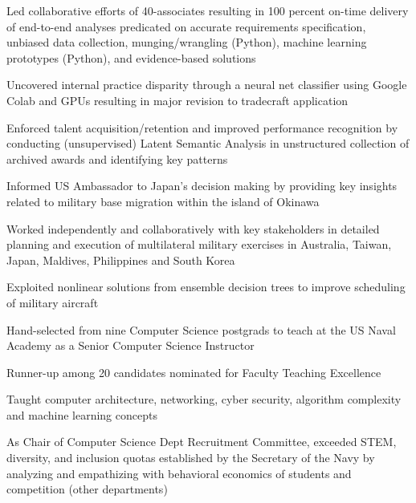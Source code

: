 \documentclass[]{Forester-Resume}
\begin{document}
\begin{minipage}[t]{0.66\textwidth}
\begin{tightemize}
\item Led collaborative efforts of 40-associates resulting in 100 percent on-time delivery of end-to-end analyses predicated on accurate requirements specification, unbiased data collection, munging/wrangling (Python), machine learning prototypes (Python), and evidence-based solutions
\item Uncovered internal practice disparity through a neural net classifier using Google Colab and GPUs resulting in major revision to tradecraft application
\item Enforced talent acquisition/retention and improved performance recognition by conducting (unsupervised) Latent Semantic Analysis in unstructured collection of archived awards and identifying key patterns 
\end{tightemize}
\sectionsep

\begin{tightemize}
\item Informed US Ambassador to Japan's decision making by providing key insights related to military base migration within the island of Okinawa
\item Worked independently and collaboratively with key stakeholders in detailed planning and execution of multilateral military exercises in Australia, Taiwan, Japan, Maldives, Philippines and South Korea
\item Exploited nonlinear solutions from ensemble decision trees to improve scheduling of military aircraft 
\end{tightemize}
\sectionsep

\begin{tightemize}
\item Hand-selected from nine Computer Science postgrads to teach at the US Naval Academy as a Senior Computer Science Instructor
\item Runner-up among 20 candidates nominated for Faculty Teaching Excellence
\item Taught computer architecture, networking, cyber security, algorithm complexity and machine learning concepts
\item As Chair of Computer Science Dept Recruitment Committee, exceeded STEM, diversity, and inclusion quotas established by the Secretary of the Navy by analyzing and empathizing with behavioral economics of students and competition (other departments)
\end{tightemize}
\sectionsep
\end{minipage} 
\end{document}
